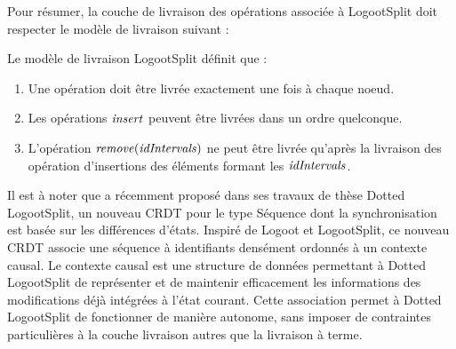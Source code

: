 Pour résumer, la couche de livraison des opérations associée à LogootSplit doit respecter le modèle de livraison suivant :

\begin{definition}
  \label{def:ls-delivery-model}
  Le modèle de livraison LogootSplit définit que :
  \begin{enumerate}
    \item Une opération doit être livrée exactement une fois à chaque noeud.
    \item Les opérations $\mathit{insert}$ peuvent être livrées dans un ordre quelconque.
    \item L'opération $\mathit{remove}(\mathit{idIntervals})$ ne peut être livrée qu'après la livraison des opération d'insertions des éléments formant les $\mathit{idIntervals}$.
  \end{enumerate}
\end{definition}

Il est à noter que \textcite{2021-these-vic} a récemment proposé dans ses travaux de thèse Dotted LogootSplit, un nouveau \ac{CRDT} pour le type Séquence dont la synchronisation est basée sur les différences d'états.
Inspiré de Logoot et LogootSplit, ce nouveau \ac{CRDT} associe une séquence à identifiants densément ordonnés à un contexte causal.
Le contexte causal est une structure de données permettant à Dotted LogootSplit de représenter et de maintenir efficacement les informations des modifications déjà intégrées à l'état courant.
Cette association permet à Dotted LogootSplit de fonctionner de manière autonome, sans imposer de contraintes particulières à la couche livraison autres que la livraison à terme.
